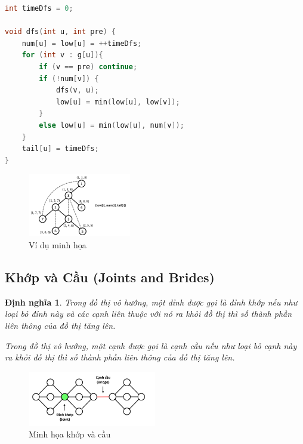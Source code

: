\documentclass{article}
\newtheorem{dinhnghia}{Định nghĩa}
\begin{document}
\begin{lstlisting}[language=C++, caption={Cài đặt}]
int timeDfs = 0; 

void dfs(int u, int pre) {
    num[u] = low[u] = ++timeDfs;
    for (int v : g[u]){
        if (v == pre) continue;
        if (!num[v]) {
            dfs(v, u);
            low[u] = min(low[u], low[v]);
        }
        else low[u] = min(low[u], num[v]);
    }
    tail[u] = timeDfs;
}
\end{lstlisting}

\begin{figure}[h]
    \centering
    \includegraphics[width=0.4\textwidth]{img/b3/Depth-First-Search-Tree_img3.png}  
    \caption{Ví dụ minh họa}  
\end{figure}

\subsection{Khớp và Cầu (Joints and Brides)}
\begin{dinhnghia}
    
    \item Trong đồ thị vô hướng, một đỉnh được gọi là đỉnh khớp nếu như loại bỏ đỉnh này và các cạnh liên thuộc với nó ra khỏi đồ thị thì số thành phần liên thông của đồ thị tăng lên.
    
    \item Trong đồ thị vô hướng, một cạnh được gọi là cạnh cầu nếu như loại bỏ cạnh này ra khỏi đồ thị thì số thành phần liên thông của đồ thị tăng lên.
\end{dinhnghia}

\begin{figure}[h]
    \centering
    \includegraphics[width=0.5\textwidth]{img/b4/Depth-First-Search-Tree_img4.png}   
    \caption{Minh họa khớp và cầu} 
\end{figure}
\end{document}
